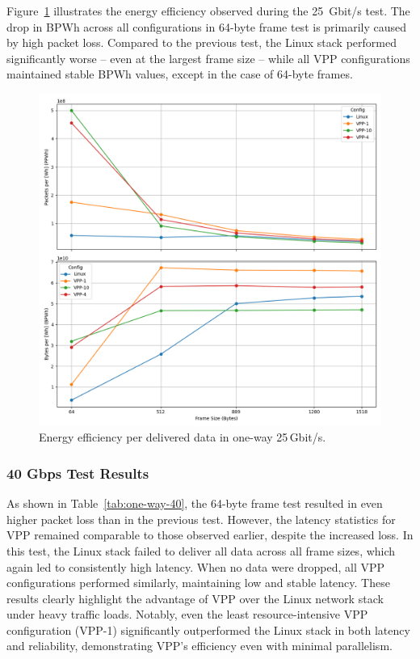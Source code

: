 Figure~\ref{fig:25g} illustrates the energy efficiency observed during the 25~Gbit/s test.
The drop in BPWh across all configurations in 64-byte frame test is primarily caused by high packet loss.
Compared to the previous test, the Linux stack performed significantly worse -- even at the largest frame size -- while all VPP configurations maintained stable BPWh values, 
except in the case of 64-byte frames.

\begin{figure}[!htbp]
    \centering
    \includegraphics[width=\linewidth]{images/consumption-25g.png}
    \caption{Energy efficiency per delivered data in one-way 25\,Gbit/s.}
    \label{fig:25g}
\end{figure}


\subsubsection{40 Gbps Test Results}

As shown in Table~\ref{tab:one-way-40}, the 64-byte frame test resulted in even higher packet loss than in the previous test.
However, the latency statistics for VPP remained comparable to those observed earlier, despite the increased loss.
In this test, the Linux stack failed to deliver all data across all frame sizes, which again led to consistently high latency.
When no data were dropped, all VPP configurations performed similarly, maintaining low and stable latency.
These results clearly highlight the advantage of VPP over the Linux network stack under heavy traffic loads.
Notably, even the least resource-intensive VPP configuration (VPP-1) significantly outperformed the Linux stack in both latency and reliability, 
demonstrating VPP’s efficiency even with minimal parallelism.

